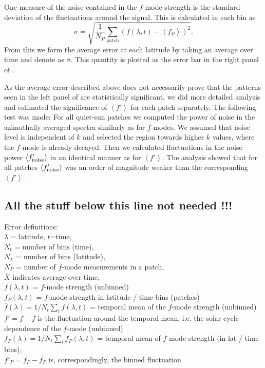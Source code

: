 \documentclass{aa}
\begin{document}
One measure of the noise contained in the $f$-mode strength is the standard deviation of the fluctuations
around the signal. This is calculated in each bin as
\begin{equation}
\sigma= \sqrt{\frac{1}{N_P}\sum_{\mbox{patch}} ( f(\lambda,t)
- \left<f_P\right>)^2}.
\end{equation}
From this we form the average error at each latitude by taking an average over time and denote as $\overline{\sigma}$. 
This quantity is plotted as the error bar in the right panel of .

As the average error described above does not necessarily prove that the patterns seen in the left panel of  are statistically significant, we did more detailed analysis and estimated the significance of $\left< f' \right>$ for each patch separately. The following test was made: For all quiet-sun patches we computed the power of noise in the azimuthally averaged spectra similarly as for $f$-modes. We assumed that noise level is independent of $k$ and selected the region towards higher $k$ values, where the $f$-mode is already decayed. Then we calculated fluctuations in the noise power $\left< f'_{\rm noise} \right>$ in an identical manner as for $\left< f' \right>$.
The analysis showed that for all patches $\left< f'_{\rm noise} \right>$ was an order of magnitude weaker than the corresponding $\left< f' \right>$.

\color{cyan}
\subsection*{All the stuff below this line not needed !!!}
Error definitions:\\
$\lambda$ = latitude, $t$=time, \\
$N_t$ = number of bins (time), \\
$N_\lambda$ = number of bins (latitude), \\
$N_P$ = number of $f$-mode measurements in a patch, \\
$\overline{X}$ indicates average over time, \\
$f(\lambda,t)$ = $f$-mode strength (unbinned)\\
$f_P(\lambda,t)$ = $f$-mode strength in latitude / time bins (patches)\\
$\overline{f}(\lambda) = 1/N_t \sum_t f(\lambda,t)$ = temporal mean of the $f$-mode strength (unbinned)\\ 
$f'=f-\overline{f}$ is the fluctuation around the temporal mean, i.e. the solar cycle dependence of the $f$-mode (unbinned)\\
$\overline{f_P}(\lambda) = 1/N_t \sum_t f_P(\lambda,t)$ = temporal mean of 
$f$-mode strength (in lat / time bins), \\
$f'_P=f_P-\overline{f_P}$ is, correspondingly, the binned fluctuation\\
\end{document}

